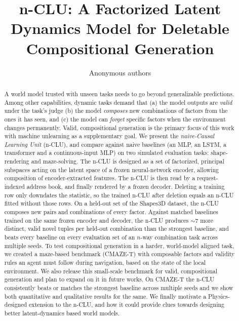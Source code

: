 \documentclass{article} %
\title{n-CLU: A Factorized Latent Dynamics Model for Deletable Compositional Generation}
\author{Anonymous authors}
\begin{document}
\maketitle

\begin{abstract}
A world model trusted with unseen tasks needs to go beyond generalizable predictions. Among other capabilities, dynamic tasks demand that (a) the model outputs are \emph{valid} under the task's judge (b) the model \emph{composes} new combinations of factors from the ones it has seen, and (c) the model can \emph{forget} specific factors when the environment changes permanently. Valid, compositional generation is the primary focus of this work with machine unlearning as a supplementary goal. We present the \emph{naive-Causal Learning Unit} (n-CLU),  and compare against naive baselines (an MLP, an LSTM, a transformer and a continuous-input MLP) on two simulated evaluation tasks: shape-rendering and maze-solving. The n-CLU is designed as a set of factorized, principal subspaces acting on the latent space of a frozen neural-network encoder, allowing composition of encoder-extracted features. The n-CLU is then read by a request-indexed address book, and finally rendered by a frozen decoder. Deleting a training row only downdates the statistic, so the trained n-CLU after deletion equals an n-CLU fitted without those rows. On a held-out set of the Shapes3D dataset,
the n-CLU composes new pairs and combinations of every factor. Against matched baselines trained on the same frozen encoder and decoder, the n-CLU produces $\sim 7$ more distinct, valid novel tuples per held-out combination than the strongest baseline, and beats every baseline on every evaluation set of an $n$-way combination task across multiple seeds. To test compositional generation in a harder, world-model aligned task, we created a maze-based benchmark (CMAZE-T) with composable factors and validity rules an agent must follow during navigation, based on the state of the local environment. We also release this small-scale benchmark for valid, compositional generation and plan to expand on it in future works. On CMAZE-T the n-CLU consistently beats or matches the strongest baseline across multiple seeds and we show both quantitative and qualitative results for the same. We finally motivate a Physics-designed extension to the n-CLU, and how it could provide clues towards designing better latent-dynamics based world models.
\end{abstract}
\end{document}
